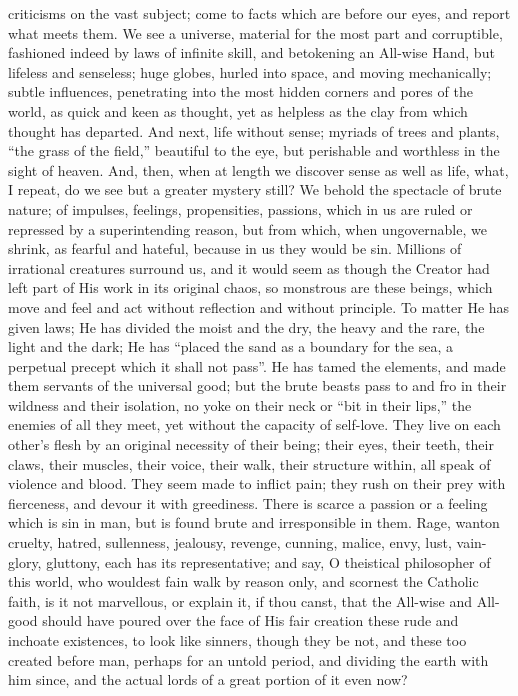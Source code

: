 criticisms on the vast subject; come to facts which are before our
eyes, and report what meets them. We see a universe, material for the
most part and corruptible, fashioned indeed by laws of infinite skill,
and betokening an All-wise Hand, but lifeless and senseless; huge
globes, hurled into space, and moving mechanically; subtle influences,
penetrating into the most hidden corners and pores of the world, as
quick and keen as thought, yet as helpless as the clay from which
thought has departed. And next, life without sense; myriads of trees
and plants, ``the grass of the field,'' beautiful to the eye,
but perishable and worthless in the sight of heaven. And, then, when
at length we discover sense as well as life, what, I repeat, do we see
but a greater mystery still? We behold the spectacle of brute nature;
of impulses, feelings, propensities, passions, which in us are ruled
or repressed by a superintending reason, but from which, when
ungovernable, we shrink, as fearful and hateful, because in us they
would be sin. Millions of irrational creatures surround us, and it
would seem as though the Creator had left part of His work in its
original chaos, so monstrous are these beings, which move and feel and
act without reflection and without principle. To matter He has given
laws; He has divided the moist and the dry, the heavy and the rare,
the light and the dark; He has ``placed the sand as a boundary for
the sea, a perpetual precept which it shall not pass''. He has
tamed the elements, and made them servants of the universal good; but
the brute beasts pass to and fro in their wildness and their
isolation, no yoke on their neck or ``bit in their lips,'' the
enemies of all they meet, yet without the capacity of self-love. They
live on each other's flesh by an original necessity of their being;
their eyes, their teeth, their claws, their muscles, their voice,
their walk, their structure within, all speak of violence and blood.
They seem made to inflict pain; they rush on their prey with
fierceness, and devour it with greediness. There is scarce a passion
or a feeling which is sin in man, but is found brute and irresponsible
in them. Rage, wanton cruelty, hatred, sullenness, jealousy, revenge,
cunning, malice, envy, lust, vain-glory, gluttony, each has its
representative; and say, O theistical philosopher of this world, who
wouldest fain walk by reason only, and scornest the Catholic faith, is
it not marvellous, or explain it, if thou canst, that the All-wise and
All-good should have poured over the face of His fair creation these
rude and inchoate existences, to look like sinners, though they be not,
and these too created before man, perhaps for an untold period, and
dividing the earth with him since, and the actual lords of a great
portion of it even now?

